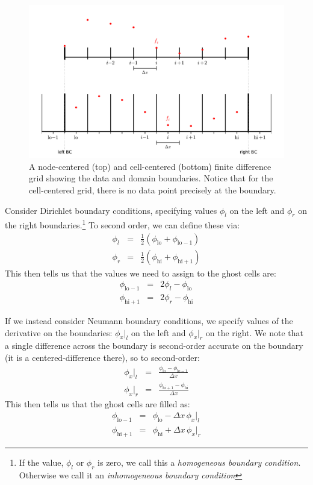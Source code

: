 \begin{figure}[h]
\centering
\includegraphics[width=\linewidth]{fv-fd_grid_bc}
\caption[Node-centered vs.\ cell-centered data at boundaries]{\label{fig:bcs} 
  A node-centered (top) and cell-centered (bottom) finite difference
  grid showing the data and domain boundaries.  Notice that for the 
  cell-centered grid, there is no data point precisely at the boundary.}
\end{figure}

Consider Dirichlet boundary conditions, specifying values $\phi_l$ on
the left and $\phi_r$ on the right boundaries.\footnote{If the value, $\phi_l$
  or $\phi_r$ is zero, we call this a {\em homogeneous boundary condition}.  Otherwise
  we call it an {\em inhomogeneous boundary condition}}  To second order, we can
define these via:
\begin{eqnarray}
\phi_l &=& \frac{1}{2} ( \phi_\mathrm{lo} + \phi_\mathrm{lo-1} ) \\
\phi_r &=& \frac{1}{2} ( \phi_\mathrm{hi} + \phi_\mathrm{hi+1} )
\end{eqnarray}
This then tells us that the values we need to assign to the ghost cells are:
\begin{eqnarray}
\label{eq:bc_inhomo_dir}
\phi_\mathrm{lo-1} &=& 2 \phi_l - \phi_\mathrm{lo} \\
\phi_\mathrm{hi+1} &=& 2 \phi_r - \phi_\mathrm{hi}
\end{eqnarray}

If we instead consider Neumann boundary conditions, we specify values
of the derivative on the boundaries: $\phi_x |_l$ on the left and
$\phi_x |_r$ on the right.  We note that a single difference across
the boundary is second-order accurate on the boundary (it is a
centered-difference there), so to second-order:
\begin{eqnarray}
\phi_x |_l &=& \frac{\phi_\mathrm{lo} - \phi_\mathrm{lo-1}}{\Delta x} \\
\phi_x |_r &=& \frac{\phi_\mathrm{hi+1} - \phi_\mathrm{hi}}{\Delta x}
\end{eqnarray}
This then tells us that the ghost cells are filled as:
\begin{eqnarray}
\label{eq:bc_inhomo_neum}
\phi_\mathrm{lo-1} &=& \phi_\mathrm{lo} - \Delta x \, \phi_x |_l \\
\phi_\mathrm{hi+1} &=& \phi_\mathrm{hi} + \Delta x \, \phi_x |_r
\end{eqnarray}


